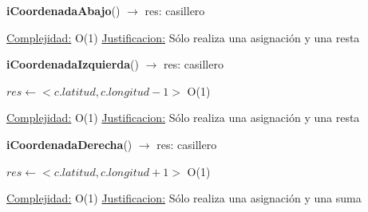 \begin{Algoritmos}
\begin{algorithm}[H]{\textbf{iCoordenadaAbajo}() $\to$ res: casillero}
\begin{algorithmic}[1]
		\medskip
		\Statex \underline{Complejidad:} O(1)
			\Statex \underline{Justificacion:} Sólo realiza una asignación y una resta
	\end{algorithmic}
\end{algorithm}

\begin{algorithm}[H]{\textbf{iCoordenadaIzquierda}() $\to$ res: casillero}
	\begin{algorithmic}[1]
		\State $res \gets <c.latitud, c.longitud - 1>$ \Comment O(1)

		\medskip
		\Statex \underline{Complejidad:} O(1)
			\Statex \underline{Justificacion:} Sólo realiza una asignación y una resta
	\end{algorithmic}
\end{algorithm}


\begin{algorithm}[H]{\textbf{iCoordenadaDerecha}() $\to$ res: casillero}
	\begin{algorithmic}[1]
		\State $res \gets <c.latitud, c.longitud + 1>$ \Comment O(1)

		\medskip
		\Statex \underline{Complejidad:} O(1)
			\Statex \underline{Justificacion:} Sólo realiza una asignación y una suma
	\end{algorithmic}
\end{algorithm}

\end{Algoritmos}
